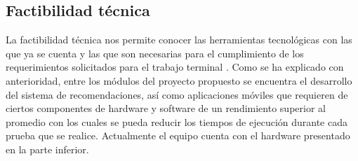 \subsection{Factibilidad técnica}
La factibilidad técnica nos permite conocer las herramientas tecnológicas con las que ya se cuenta y las que son necesarias para el cumplimiento de los requerimientos solicitados para el trabajo terminal \cite{Factibilidad1}. Como se ha explicado con anterioridad, entre los módulos del proyecto propuesto se encuentra el desarrollo del sistema de recomendaciones, así como aplicaciones móviles que requieren de ciertos componentes de hardware y software de un rendimiento superior al promedio con los cuales se pueda reducir los tiempos de ejecución durante cada prueba que se realice.
Actualmente el equipo cuenta con el hardware presentado en la parte inferior.
\\ \par
